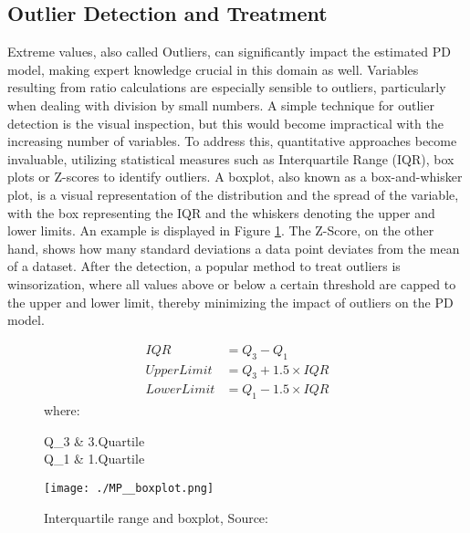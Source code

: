 \subsection{Outlier Detection and Treatment}
\label{sec:OutlTr}
Extreme values, also called Outliers, can significantly impact the estimated PD model, making expert knowledge crucial in this domain as well. Variables resulting from ratio calculations are especially sensible to outliers, particularly when dealing with division by small numbers. A simple technique for outlier detection is the visual inspection, but this would become impractical with the increasing number of variables. To address this, quantitative approaches become invaluable, utilizing statistical measures such as Interquartile Range (IQR), box plots or Z-scores to identify outliers. A boxplot, also known as a box-and-whisker plot, is a visual representation of the distribution and the spread of the variable, with the box representing the IQR and the whiskers denoting the upper and lower limits. An example is displayed in Figure \ref{fig:dp_iqr_boxpl}. The Z-Score, on the other hand, shows how many standard deviations a data point deviates from the mean of a dataset. After the detection, a popular method to treat outliers is winsorization, where all values above or below a certain threshold are capped to the upper and lower limit, thereby minimizing the impact of outliers on the PD model. \cite[p.~250]{Python:2022}

\begin{figure}[H]
\begin{minipage}{.5\textwidth}
	\begin{align} 
	IQR &= Q_3 - Q_1 \label{eq:dp_iqr_boxpl1}\\
	Upper Limit &= Q_3 + 1.5 \times IQR \label{eq:dp_iqr_boxpl2}\\
	Lower Limit &= Q_1 - 1.5 \times IQR \label{eq:dp_iqr_boxpl3}
	\end{align}
	where:
	\begin{conditions}
	Q_{3}  		& 3.Quartile \\
	Q_{1}  		& 1.Quartile \\
	\end{conditions}
\end{minipage}%
\begin{minipage}{.5\textwidth}
	\centering
	\texttt{[image: ./MP\_\_boxplot.png]}
\end{minipage}
    \caption{Interquartile range and boxplot, Source: \cite{Boxplot:2019}}
    \label{fig:dp_iqr_boxpl}
\end{figure}

